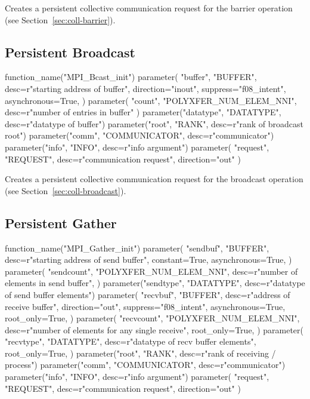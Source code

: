 Creates a persistent collective communication request for the barrier operation (see Section~\ref{sec:coll-barrier}).

\subsection{Persistent Broadcast}
\label{sec:pcoll-broadcast}

\begin{mpi-binding}
    function_name("MPI_Bcast_init")
    parameter(
        "buffer",
        "BUFFER",
        desc=r"starting address of buffer",
        direction="inout",
        suppress="f08_intent",
        asynchronous=True,
    )
    parameter(
        "count", "POLYXFER_NUM_ELEM_NNI", desc=r"number of entries in buffer"
    )
    parameter("datatype", "DATATYPE", desc=r"datatype of buffer")
    parameter("root", "RANK", desc=r"rank of broadcast root")
    parameter("comm", "COMMUNICATOR", desc=r"communicator")
    parameter("info", "INFO", desc=r"info argument")
    parameter(
        "request", "REQUEST", desc=r"communication request", direction="out"
    )
\end{mpi-binding}

Creates a persistent collective communication request for the broadcast operation
(see Section~\ref{sec:coll-broadcast}).

\subsection{Persistent Gather}
\label{sec:pcoll-gather}

\begin{mpi-binding}
    function_name("MPI_Gather_init")
    parameter(
        "sendbuf",
        "BUFFER",
        desc=r"starting address of send buffer",
        constant=True,
        asynchronous=True,
    )
    parameter(
        "sendcount",
        "POLYXFER_NUM_ELEM_NNI",
        desc=r"number of elements in send buffer",
    )
    parameter("sendtype", "DATATYPE", desc=r"datatype of send buffer elements")
    parameter(
        "recvbuf",
        "BUFFER",
        desc=r"address of receive buffer",
        direction="out",
        suppress="f08_intent",
        asynchronous=True,
        root_only=True,
    )
    parameter(
        "recvcount",
        "POLYXFER_NUM_ELEM_NNI",
        desc=r"number of elements for any single receive",
        root_only=True,
    )
    parameter(
        "recvtype",
        "DATATYPE",
        desc=r"datatype of recv buffer elements",
        root_only=True,
    )
    parameter("root", "RANK", desc=r"rank of receiving \MPI/ process")
    parameter("comm", "COMMUNICATOR", desc=r"communicator")
    parameter("info", "INFO", desc=r"info argument")
    parameter(
        "request", "REQUEST", desc=r"communication request", direction="out"
    )
\end{mpi-binding}

